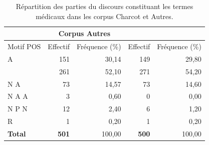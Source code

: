 \begin{table}[h]
	\centering
	\begin{tabular}{|lrr|rl|}
		\hline\hline
		\rowcolor{grey!10}\multicolumn{3}{|c|}{Corpus Charcot}                                                                    & \multicolumn{2}{c|}{Corpus Autres}                               \\ \hline
		\multicolumn{1}{|c|}{Motif POS}      & \multicolumn{1}{c|}{Effectif} & \multicolumn{1}{c|}{Fréquence (\%)} & \multicolumn{1}{c|}{Effectif} & \multicolumn{1}{c|}{Fréquence (\%)} \\ \hline
		\multicolumn{1}{|l|}{\textsc{A}}              & \multicolumn{1}{r|}{151}               & 30,14                   & \multicolumn{1}{r|}{149}               & \multicolumn{1}{r|}{29,80}                   \\ \hline
		\rowcolor{yellow!30}\multicolumn{1}{|l|}{\textsc{N}}              & \multicolumn{1}{r|}{261}               & 52,10                   & \multicolumn{1}{r|}{271}               & \multicolumn{1}{r|}{54,20}                   \\ \hline
		\multicolumn{1}{|l|}{\textsc{N A}}            & \multicolumn{1}{r|}{73}                & 14,57                   & \multicolumn{1}{r|}{73}                & \multicolumn{1}{r|}{14,60}                   \\ \hline
		\multicolumn{1}{|l|}{\textsc{N A A}}          & \multicolumn{1}{r|}{3}                 & 0,60                    & \multicolumn{1}{r|}{0}                 & \multicolumn{1}{r|}{0,00}                    \\ \hline
		\multicolumn{1}{|l|}{\textsc{N P N}}          & \multicolumn{1}{r|}{12}                & 2,40                    & \multicolumn{1}{r|}{6}                 & \multicolumn{1}{r|}{1,20}                    \\ \hline
		\multicolumn{1}{|l|}{\textsc{R}}              & \multicolumn{1}{r|}{1}                 & 0,20                    & \multicolumn{1}{r|}{1}                 & \multicolumn{1}{r|}{0,20}                    \\ \hline\hline
		\multicolumn{1}{|l|}{\textbf{Total}} & \multicolumn{1}{r|}{\textbf{501}}      & 100,00                  & \multicolumn{1}{r|}{\textbf{500}}      & \multicolumn{1}{r|}{100,00}                 \\ \hline\hline
	\end{tabular}
	\caption{Répartition des parties du discours constituant les termes médicaux dans les corpus \og{}Charcot\fg{} et \og{}Autres\fg{}.}
	\label{tab:repartition_POS}
\end{table}

